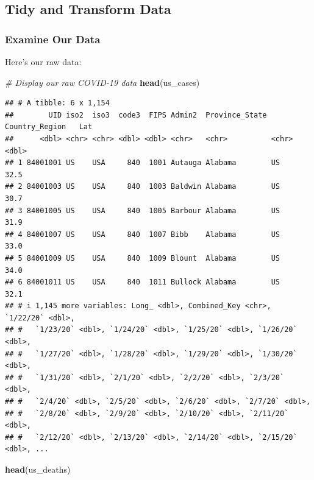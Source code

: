 \documentclass[
]{article}
\newenvironment{Shaded}{\begin{snugshade}}{\end{snugshade}}
\newcommand{\CommentTok}[1]{\textcolor[rgb]{0.56,0.35,0.01}{\textit{#1}}}
\newcommand{\FunctionTok}[1]{\textcolor[rgb]{0.13,0.29,0.53}{\textbf{#1}}}
\newcommand{\NormalTok}[1]{#1}
\begin{document}
\subsection{Tidy and Transform Data}\label{tidy-and-transform-data}

\subsubsection{Examine Our Data}\label{examine-our-data}

Here's our raw data:

\begin{Shaded}
\begin{Highlighting}[]
\CommentTok{\# Display our raw COVID{-}19 data}
\FunctionTok{head}\NormalTok{(us\_cases)}
\end{Highlighting}
\end{Shaded}

\begin{verbatim}
## # A tibble: 6 x 1,154
##        UID iso2  iso3  code3  FIPS Admin2  Province_State Country_Region   Lat
##      <dbl> <chr> <chr> <dbl> <dbl> <chr>   <chr>          <chr>          <dbl>
## 1 84001001 US    USA     840  1001 Autauga Alabama        US              32.5
## 2 84001003 US    USA     840  1003 Baldwin Alabama        US              30.7
## 3 84001005 US    USA     840  1005 Barbour Alabama        US              31.9
## 4 84001007 US    USA     840  1007 Bibb    Alabama        US              33.0
## 5 84001009 US    USA     840  1009 Blount  Alabama        US              34.0
## 6 84001011 US    USA     840  1011 Bullock Alabama        US              32.1
## # i 1,145 more variables: Long_ <dbl>, Combined_Key <chr>, `1/22/20` <dbl>,
## #   `1/23/20` <dbl>, `1/24/20` <dbl>, `1/25/20` <dbl>, `1/26/20` <dbl>,
## #   `1/27/20` <dbl>, `1/28/20` <dbl>, `1/29/20` <dbl>, `1/30/20` <dbl>,
## #   `1/31/20` <dbl>, `2/1/20` <dbl>, `2/2/20` <dbl>, `2/3/20` <dbl>,
## #   `2/4/20` <dbl>, `2/5/20` <dbl>, `2/6/20` <dbl>, `2/7/20` <dbl>,
## #   `2/8/20` <dbl>, `2/9/20` <dbl>, `2/10/20` <dbl>, `2/11/20` <dbl>,
## #   `2/12/20` <dbl>, `2/13/20` <dbl>, `2/14/20` <dbl>, `2/15/20` <dbl>, ...
\end{verbatim}

\begin{Shaded}
\begin{Highlighting}[]
\FunctionTok{head}\NormalTok{(us\_deaths)}
\end{Highlighting}
\end{Shaded}
\end{document}

